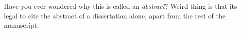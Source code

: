 

Have you ever wondered why this is called an \emph{abstract}? Weird thing is
that its legal to cite the abstract of a dissertation alone, apart from the
rest of the manuscript.
